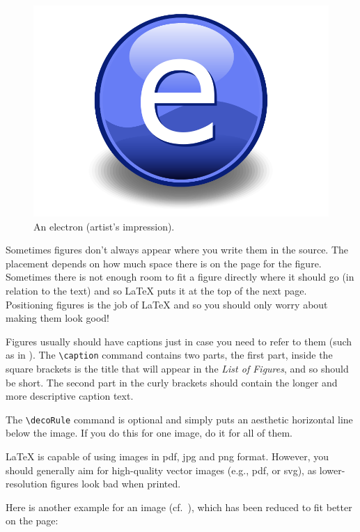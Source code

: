 \begin{figure}[th]
\centering
\includegraphics{figures/electron}
\decoRule
\caption[An Electron]{An electron (artist's impression).}
\label{fig:Electron}
\end{figure}

Sometimes figures don't always appear where you write them in the source. The placement depends on how much space there is on the page for the figure. Sometimes there is not enough room to fit a figure directly where it should go (in relation to the text) and so \LaTeX{} puts it at the top of the next page. Positioning figures is the job of \LaTeX{} and so you should only worry about making them look good!

Figures usually should have captions just in case you need to refer to them (such as in ). The \verb|\caption| command contains two parts, the first part, inside the square brackets is the title that will appear in the \emph{List of Figures}, and so should be short. The second part in the curly brackets should contain the longer and more descriptive caption text.

The \verb|\decoRule| command is optional and simply puts an aesthetic horizontal line below the image. If you do this for one image, do it for all of them.

\LaTeX{} is capable of using images in pdf, jpg and png format.
However, you should generally aim for high-quality vector images (e.g., pdf, or svg), as lower-resolution figures look bad when printed.

Here is another example for an image (cf.~), which has been reduced to fit better on the page:

